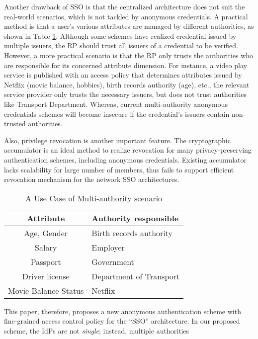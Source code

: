 \documentclass[journal]{IEEEtran}
\begin{document}
Another drawback of SSO is that the centralized architecture does not suit the real-world scenarios, which is not tackled by anonymous credentials. A practical method is that a user's various attributes are managed by different authorities, as shown in Table \ref{table:usecase}. Although some schemes have realized credential issued by multiple issuers, the RP should trust all issuers of a credential to be verified. However, a more practical scenario is that the RP only trusts the authorities who are responsible for its concerned attribute dimension. For instance, a video play service is published with an access policy that determines attributes issued by Netflix (movie balance, hobbies), birth records authority (age), etc., the relevant service provider only trusts the necessary issuers, but does not trust authorities like Transport Department. Whereas, current multi-authority anonymous credentials schemes will become insecure if the credential's issuers contain non-trusted authorities. 

Also, privilege revocation is another important feature. The cryptographic accumulator \cite{accumulator2015revisiting, boneh2019RSA, nguyen2005accumulators} is an ideal method to realize revocation for many privacy-preserving authentication schemes, including anonymous credentials. Existing accumulator lacks scalability for large number of members, thus fails to support efficient revocation mechanism for the network SSO architectures. 

\begin{table}[t]
	\caption{A Use Case of Multi-authority scenario}\label{table:usecase}
	\centering
	\begin{tabular}{c|l}
		\hline
		Attribute & Authority responsible\\
		\hline
		Age, Gender & Birth records authority\\
		Salary & Employer\\
		Passport & Government\\
		Driver license & Department of Transport\\
		Movie Balance Status & Netflix\\
		\hline
	\end{tabular}
\end{table}

This paper, therefore, proposes a new anonymous authentication scheme with fine-grained access control policy for the ``SSO'' architecture. In our proposed scheme, the IdPs are not \textit{single}; instead, multiple authorities 
\end{document}

